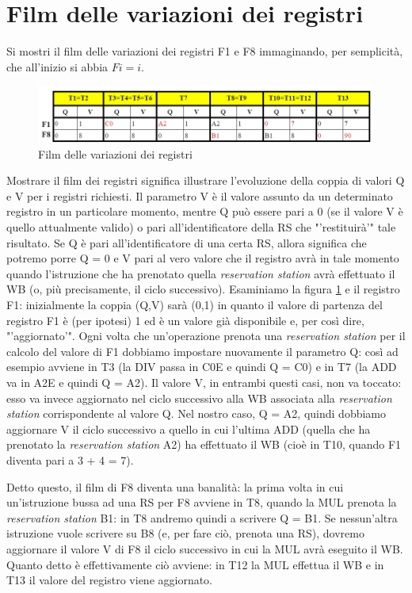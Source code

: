 \section{Film delle variazioni dei registri}
\label{sec:filmRegistri}

\textsf{Si mostri il film delle variazioni dei registri F1 e F8 immaginando, per semplicità, che all'inizio si abbia $Fi=i$.}

\begin{figure}[!h]
\centering
\includegraphics[width=\columnwidth]{img/tomasEs1c}
\caption{Film delle variazioni dei registri}
\label{fig:tomasEs1c}
\end{figure}

Mostrare il film dei registri significa illustrare l'evoluzione della coppia di valori Q e V per i registri richiesti. Il parametro V è il valore assunto da un determinato registro in un particolare momento, mentre Q può essere pari a 0 (se il valore V è quello attualmente valido) o pari all'identificatore della RS che "'restituirà'" tale risultato. Se Q è pari all'identificatore di una certa RS, allora significa che potremo porre Q = 0 e V pari al vero valore che il registro avrà in tale momento quando l'istruzione che ha prenotato quella \textit{reservation station} avrà effettuato il WB (o, più precisamente, il ciclo successivo). 
Esaminiamo la figura \ref{fig:tomasEs1c} e il registro F1: inizialmente la coppia (Q,V) sarà (0,1) in quanto il valore di partenza del registro F1 è (per ipotesi) 1 ed è un valore già disponibile e, per così dire, "'aggiornato'". Ogni volta che un'operazione prenota una \textit{reservation station} per il calcolo del valore di F1 dobbiamo impostare nuovamente il parametro Q: così ad esempio avviene in T3 (la DIV passa in C0E e quindi Q = C0) e in T7 (la ADD va in A2E e quindi Q = A2). Il valore V, in entrambi questi casi, non va toccato: esso va invece aggiornato nel ciclo successivo alla WB associata alla \textit{reservation station} corrispondente al valore Q. Nel nostro caso, Q = A2, quindi dobbiamo aggiornare V il ciclo successivo a quello in cui l'ultima ADD (quella che ha prenotato la \textit{reservation station} A2) ha effettuato il WB (cioè in T10, quando F1 diventa pari a 3 + 4 = 7).

Detto questo, il film di F8 diventa una banalità: la prima volta in cui un'istruzione bussa ad una RS per F8 avviene in T8, quando la MUL prenota la \textit{reservation station} B1: in T8 andremo quindi a scrivere Q = B1. Se nessun'altra istruzione vuole scrivere su B8 (e, per fare ciò, prenota una RS), dovremo aggiornare il valore V di F8 il ciclo successivo in cui la MUL avrà eseguito il WB. Quanto detto è effettivamente ciò avviene: in T12 la MUL effettua il WB e in T13 il valore del registro viene aggiornato.

